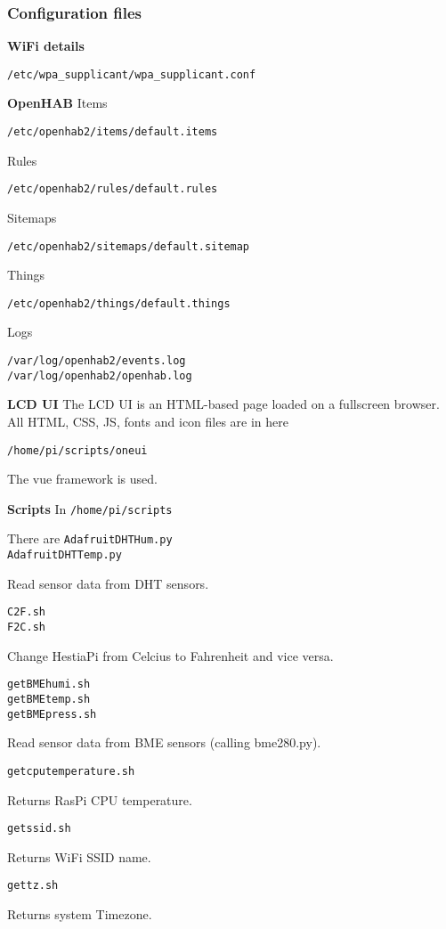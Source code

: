 \subsubsection{Configuration files}

\textbf{WiFi details}

\texttt{/etc/wpa\_supplicant/wpa\_supplicant.conf}

\textbf{OpenHAB}
Items

\texttt{/etc/openhab2/items/default.items}

Rules

\texttt{/etc/openhab2/rules/default.rules}

Sitemaps

\texttt{/etc/openhab2/sitemaps/default.sitemap}

Things

\texttt{/etc/openhab2/things/default.things}

Logs

\texttt{/var/log/openhab2/events.log\\
/var/log/openhab2/openhab.log}

\textbf{LCD UI}
The LCD UI is an HTML-based page loaded on a fullscreen browser. All HTML, CSS, JS, fonts and icon files are in here

\texttt{/home/pi/scripts/oneui}

The vue framework is used.
    
\textbf{Scripts}
In 
\texttt{/home/pi/scripts}

There are
\texttt{AdafruitDHTHum.py\\
AdafruitDHTTemp.py}

Read sensor data from DHT sensors.

\texttt{C2F.sh\\
F2C.sh}

Change HestiaPi from Celcius to Fahrenheit and vice versa.

\texttt{getBMEhumi.sh\\
getBMEtemp.sh\\
getBMEpress.sh}

Read sensor data from BME sensors (calling bme280.py).

\texttt{getcputemperature.sh}

Returns RasPi CPU temperature.

\texttt{getssid.sh}

Returns WiFi SSID name.

\texttt{gettz.sh}

Returns system Timezone.

